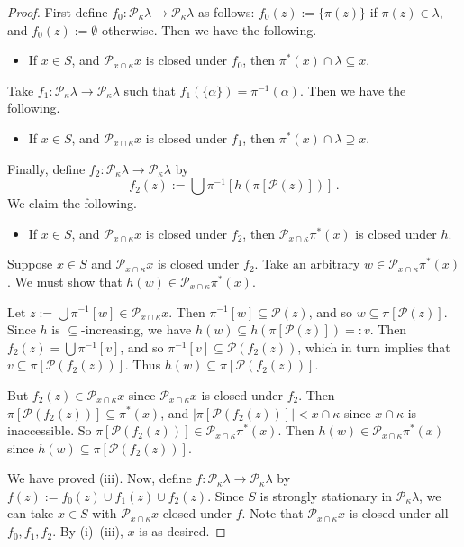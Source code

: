 \documentclass[a4paper,12pt,reqno,oneside]{amsart}
\theoremstyle{plain}
\newcommand{\mcal}{\mathcal}
\begin{document}
\begin{proof}
First define $f_0 : \mcal{P}_\kappa \lambda \to \mcal{P}_\kappa \lambda$ as follows: $f_0 (z) := \{ \pi (z) \}$ if $\pi (z) \in \lambda$, and $f_0 (z) := \emptyset$ otherwise. Then we have the following.
\begin{itemize}
\item[(i)] If $x \in S$, and $\mcal{P}_{x \cap \kappa} x$ is closed under $f_0$, then $\pi^* (x) \cap \lambda \subseteq x$.
\end{itemize}
Take $f_1 : \mcal{P}_\kappa \lambda \to \mcal{P}_\kappa \lambda$ such that $f_1 ( \{ \alpha \} ) = \pi^{-1} ( \alpha )$. Then we have the following.
\begin{itemize}
\item[(ii)] If $x \in S$, and $\mcal{P}_{x \cap \kappa} x$ is closed under $f_1$, then $\pi^* (x) \cap \lambda \supseteq x$.
\end{itemize}
Finally, define $f_2 : \mcal{P}_\kappa \lambda \to \mcal{P}_\kappa \lambda$ by
\[
f_2 (z) := \bigcup \pi^{-1} [ h( \pi [ \mcal{P} (z) ] ) ] \, .
\]
We claim the following.
\begin{itemize}
\item[(iii)] If $x \in S$, and $\mcal{P}_{x \cap \kappa} x$ is closed under $f_2$, then $\mcal{P}_{x \cap \kappa} \pi^* (x)$ is closed under $h$.
\end{itemize}

Suppose $x \in S$ and $\mcal{P}_{x \cap \kappa} x$ is closed under $f_2$. Take an arbitrary $w \in \mcal{P}_{x \cap \kappa} \pi^* (x)$. We must show that $h(w) \in \mcal{P}_{x \cap \kappa} \pi^* (x)$.

Let $z := \bigcup \pi^{-1} [w] \in \mcal{P}_{x \cap \kappa} x$. Then $\pi^{-1} [w] \subseteq \mcal{P} (z)$, and so $w \subseteq \pi [ \mcal{P} (z) ]$. Since $h$ is $\subseteq$-increasing, we have $h(w) \subseteq h( \pi [ \mcal{P} (z) ] ) =: v$. Then $f_2 (z) = \bigcup \pi^{-1} [v]$, and so $\pi^{-1} [v] \subseteq \mcal{P} ( f_2 (z) )$, which in turn implies that $v \subseteq \pi [ \mcal{P} ( f_2 (z) ) ]$. Thus $h(w) \subseteq \pi [ \mcal{P} ( f_2 (z) ) ]$.

But $f_2 (z) \in \mcal{P}_{x \cap \kappa} x$ since $\mcal{P}_{x \cap \kappa} x$ is closed under $f_2$. Then $\pi [ \mcal{P} ( f_2 (z) ) ] \subseteq \pi^* (x)$, and $| \pi [ \mcal{P} ( f_2 (z) ) ] | < x \cap \kappa$ since $x \cap \kappa$ is inaccessible. So $\pi [ \mcal{P} ( f_2 (z) ) ] \in \mcal{P}_{x \cap \kappa} \pi^* (x)$. Then $h(w) \in \mcal{P}_{x \cap \kappa} \pi^* (x)$ since $h(w) \subseteq \pi [ \mcal{P} ( f_2 (z) ) ]$.

We have proved (iii). Now, define $f : \mcal{P}_\kappa \lambda \to \mcal{P}_\kappa \lambda$ by $f(z) := f_0 (z) \cup f_1 (z) \cup f_2 (z)$. Since $S$ is strongly stationary in $\mcal{P}_\kappa \lambda$, we can take $x \in S$ with $\mcal{P}_{x \cap \kappa} x$ closed under $f$. Note that $\mcal{P}_{x \cap \kappa} x$ is closed under all $f_0 , f_1 , f_2$. By (i)--(iii), $x$ is as desired.
\end{proof}
\end{document}
